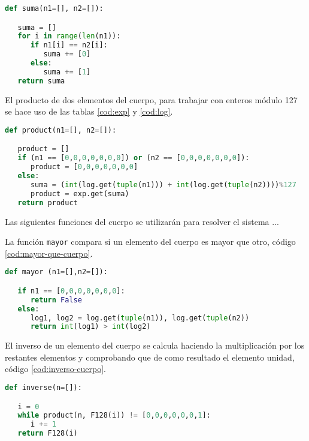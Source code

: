 \begin{lstlisting}[language=Python,caption=Suma de dos elementos del cuerpo, label=cod:suma-cuerpo]
def suma(n1=[], n2=[]):

   suma = []
   for i in range(len(n1)):
      if n1[i] == n2[i]:
         suma += [0]
      else:
         suma += [1]
   return suma
\end{lstlisting}

El producto de dos elementos del cuerpo, para trabajar con enteros módulo 127 se hace uso de las tablas \ref{cod:exp} y \ref{cod:log}.\\

\begin{lstlisting}[language=Python,caption=Producto de dos elementos del cuerpo, label=cod:producto-cuerpo]
def product(n1=[], n2=[]):

   product = []
   if (n1 == [0,0,0,0,0,0,0]) or (n2 == [0,0,0,0,0,0,0]):
      product = [0,0,0,0,0,0,0]
   else:
      suma = (int(log.get(tuple(n1))) + int(log.get(tuple(n2))))%127
      product = exp.get(suma)
   return product
\end{lstlisting}


Las siguientes funciones del cuerpo se utilizarán para resolver el sistema ...

La función \texttt{mayor} compara si un elemento del cuerpo es mayor que otro, código \ref{cod:mayor-que-cuerpo}.\\

\begin{lstlisting}[language=Python,caption=Compara dos elementos del cuerpo, label=cod:mayor-que-cuerpo]
def mayor (n1=[],n2=[]):

   if n1 == [0,0,0,0,0,0,0]:
      return False
   else:
      log1, log2 = log.get(tuple(n1)), log.get(tuple(n2))
      return int(log1) > int(log2)
\end{lstlisting}


El inverso de un elemento del cuerpo se calcula haciendo la multiplicación por los restantes elementos y comprobando que de como resultado el elemento unidad, código \ref{cod:inverso-cuerpo}.\\

\begin{lstlisting}[language=Python,caption=Inverso de un elemento del cuerpo, label=cod:inverso-cuerpo]
def inverse(n=[]):

   i = 0
   while product(n, F128(i)) != [0,0,0,0,0,0,1]:
      i += 1
   return F128(i)
\end{lstlisting}

